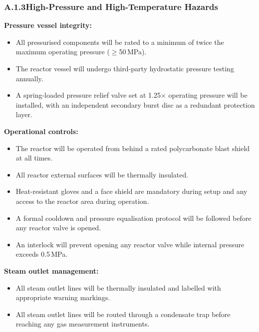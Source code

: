 \documentclass[12pt]{article}
\begin{document}
\subsubsection*{A.1.3\quad High-Pressure and High-Temperature Hazards}

\noindent\textbf{Pressure vessel integrity:}
\begin{itemize}[itemsep=3pt]
    \item All pressurised components will be rated to a minimum of twice the
          maximum operating pressure ($\geq$50\,MPa).
    \item The reactor vessel will undergo third-party hydrostatic pressure testing
          annually.
    \item A spring-loaded pressure relief valve set at 1.25$\times$ operating
          pressure will be installed, with an independent secondary burst disc as
          a redundant protection layer.
\end{itemize}

\medskip
\noindent\textbf{Operational controls:}
\begin{itemize}[itemsep=3pt]
    \item The reactor will be operated from behind a rated polycarbonate blast
          shield at all times.
    \item All reactor external surfaces will be thermally insulated.
    \item Heat-resistant gloves and a face shield are mandatory during setup and
          any access to the reactor area during operation.
    \item A formal cooldown and pressure equalisation protocol will be followed
          before any reactor valve is opened.
    \item An interlock will prevent opening any reactor valve while internal
          pressure exceeds 0.5\,MPa.
\end{itemize}

\medskip
\noindent\textbf{Steam outlet management:}
\begin{itemize}[itemsep=3pt]
    \item All steam outlet lines will be thermally insulated and labelled with
          appropriate warning markings.
    \item All steam outlet lines will be routed through a condensate trap before
          reaching any gas measurement instruments.
\end{itemize}
\end{document}
